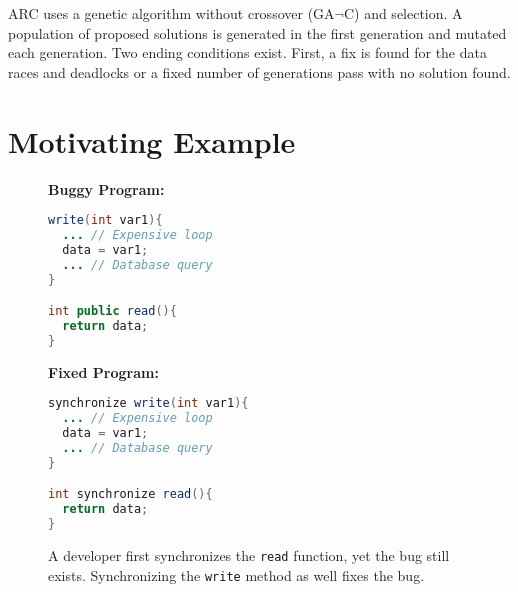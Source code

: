 \documentclass[runningheads,a4paper]{llncs}
\begin{document}
ARC uses a genetic algorithm without crossover (GA$\neg$C) and selection. A population of proposed solutions is generated in the first generation and mutated each generation. Two ending conditions exist.  First, a fix is found for the data races and deadlocks or a fixed number of generations pass with no solution found.



\section{Motivating Example}
\label{sec:motivation}

\begin{figure}[t!]
\begin{minipage}{5cm}
\footnotesize{\textbf{Buggy Program:}}
\begin{lstlisting}[language=Java, morekeywords={synchronize}]
write(int var1){
  ... // Expensive loop
  data = var1;
  ... // Database query
}

int public read(){
  return data;
}
\end{lstlisting}
\end{minipage}\hfill
\begin{minipage}{5cm}
\footnotesize{\textbf{Fixed Program:}}
\begin{lstlisting}[language=Java, morekeywords={synchronize}]
synchronize write(int var1){
  ... // Expensive loop
  data = var1;
  ... // Database query
}

int synchronize read(){
  return data;
}
\end{lstlisting}
\end{minipage}
\caption{A developer first synchronizes the \texttt{read} function, yet the bug
still exists. Synchronizing the \texttt{write} method as well fixes the bug.}
\label{fig:fixed_sample_datarace}
\end{figure}
\end{document}
